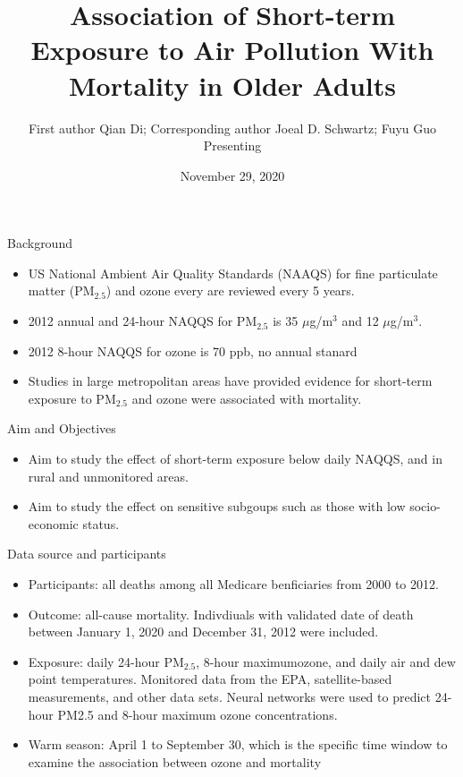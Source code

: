 \documentclass[ignorenonframetext,]{beamer}
\title{Association of Short-term Exposure to Air Pollution With Mortality in
Older Adults}
\author{First author Qian Di; Corresponding author Joeal D. Schwartz; Fuyu Guo
Presenting}
\date{November 29, 2020}
\providecommand{\tightlist}{%
  \setlength{\itemsep}{0pt}\setlength{\parskip}{0pt}}
\begin{document}
\frame{\titlepage}

\begin{frame}{Background}

\begin{itemize}
\tightlist
\item
  US National Ambient Air Quality Standards (NAAQS) for fine particulate
  matter (PM\(_{2.5}\)) and ozone every are reviewed every 5 years.
\item
  2012 annual and 24-hour NAQQS for PM\(_{2.5}\) is 35
  \(\mu\)g/m\(^{3}\) and 12 \(\mu\)g/m\(^{3}\).
\item
  2012 8-hour NAQQS for ozone is 70 ppb, no annual stanard
\item
  Studies in large metropolitan areas have provided evidence for
  short-term exposure to PM\(_{2.5}\) and ozone were associated with
  mortality.
\end{itemize}

\end{frame}

\begin{frame}{Aim and Objectives}

\begin{itemize}
\tightlist
\item
  Aim to study the effect of short-term exposure below daily NAQQS, and
  in rural and unmonitored areas.
\item
  Aim to study the effect on sensitive subgoups such as those with low
  socio-economic status.
\end{itemize}

\end{frame}

\begin{frame}{Data source and participants}

\begin{itemize}
\tightlist
\item
  Participants: all deaths among all Medicare benficiaries from 2000 to
  2012.
\item
  Outcome: all-cause mortality. Indivdiuals with validated date of death
  between January 1, 2020 and December 31, 2012 were included.
\item
  Exposure: daily 24-hour PM\(_{2.5}\), 8-hour maximumozone, and daily
  air and dew point temperatures. Monitored data from the EPA,
  satellite-based measurements, and other data sets. Neural networks
  were used to predict 24-hour PM2.5 and 8-hour maximum ozone
  concentrations.
\item
  Warm season: April 1 to September 30, which is the specific time
  window to examine the association between ozone and mortality
\end{itemize}

\end{frame}
\end{document}
